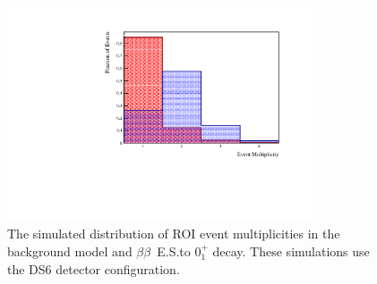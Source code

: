 \documentclass[notitlepage,rmp,aps,10pt]{revtex4-1}
\newcommand{\bb}{${\beta \beta}$}
\newcommand{\bbes}{\bb~E.S.}
\newcommand{\SP}[3]{$#1^{#2}_{#3}$}
\begin{document}
\begin{figure}[h]
  \centering
  \includegraphics[width=0.8\textwidth]{MultHist}
  \caption[Event Multiplicity in E.S. decay and BG model simulations]{\label{fig:multhist}
    The simulated distribution of ROI event multiplicities in the background model and \bbes to \SP{0}{+}{1} decay. These simulations use the DS6 detector configuration.}
\end{figure}
\end{document}
